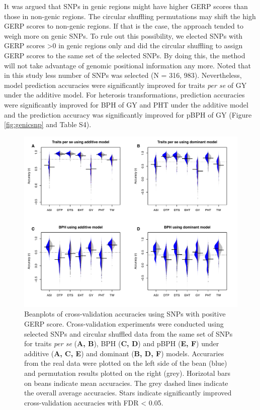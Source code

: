 \documentclass[9pt,twocolumn,twoside]{gsajnl}
\begin{document}
It was argued that SNPs in genic regions might have higher GERP scores than those in non-genic regions. The circular shuffling permutations may shift the high GERP scores to non-genic regions. If that is the case, the approach tended to weigh more on genic SNPs. To rule out this possibility, we elected SNPs with GERP scores >0 in genic regions only and did the circular shuffling to assign GERP scores to the same set of the selected SNPs. By doing this, the method will not take advantage of genomic positional information any more. Noted that in this study less number of SNPs was selected (N = 316, 983). Nevertheless, model prediction accuracies were significantly improved for traits \emph{per se} of GY under the additive model. For heterosis transformations, prediction accuracies were significantly improved for BPH of GY and PHT under the additive model and the prediction accuracy was significantly improved for pBPH of GY (Figure \ref{fig:genicsnp} and Table S4).   


\begin{figure}[htbp]
\centering
\includegraphics[width=\linewidth]{Figure_gerpall.pdf}
\caption{Beanplots of cross-validation accuracies using SNPs with positive GERP score. Cross-validation experiments were conducted using selected SNPs and circular shuffled data from the same set of SNPs for traits \emph{per se} (\textbf{A, B}), BPH (\textbf{C, D}) and pBPH (\textbf{E, F}) under additive (\textbf{A, C, E}) and dominant (\textbf{B, D, F}) models. Accuraries from the real data were plotted on the left side of the bean (blue) and permutation results plotted on the right (grey). Horizotal bars on beans indicate mean accuracies. The grey dashed lines indicate the overall average accuracies. Stars indicate significantly improved cross-validation accuracies with FDR < 0.05.}
\label{fig:gerpall}
\end{figure}
\end{document}
